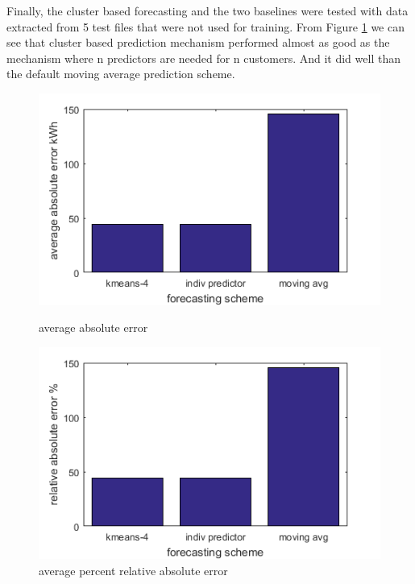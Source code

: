 Finally, the cluster based forecasting and the two baselines were tested with data extracted from 5 test files that were not used for training. From Figure \ref{fig:prediction-scheme-vs-error} we can see that cluster based prediction mechanism performed almost as good as the mechanism where n predictors are needed for n customers. And it did well than the default moving average prediction scheme.



\begin{figure}[h!]
\centering
\begin{minipage}{.5\textwidth}
  \centering
  \includegraphics[width=\linewidth]{final-avg-abs-error.png}
  \caption{average absolute error}
  \label{fig:prediction-scheme-vs-error}
\end{minipage}%
\begin{minipage}{.5\textwidth}
  \centering
  \includegraphics[width=\linewidth]{final-relative-abs-error.png}
  \caption{average percent relative absolute error}
\end{minipage}

  
\end{figure}